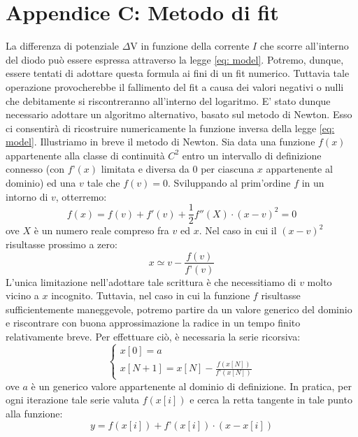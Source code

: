 \documentclass{article}[a4paper, oneside, 11pt]
\begin{document}
\section{Appendice C: Metodo di fit}\label{app: C}
La differenza di potenziale $\Delta$V in funzione della corrente $I$ che scorre 
all’interno del diodo può essere espressa attraverso la legge
\eqref{eq: model}. Potremo, dunque, essere tentati di adottare questa formula
ai fini di un fit numerico. 
Tuttavia tale operazione provocherebbe il fallimento del fit a causa dei valori 
negativi o nulli che debitamente si riscontreranno all’interno del logaritmo. 
E’ stato dunque necessario adottare un algoritmo alternativo, basato sul 
metodo di Newton\cite{tesi}. Esso ci consentirà di ricostruire numericamente 
la funzione inversa della legge \eqref{eq: model}.
Illustriamo in breve il metodo di Newton. Sia data una funzione $f(x)$
appartenente alla classe di continuità $C^{2}$
entro un intervallo di definizione connesso (con $f’(x)$ limitata e 
diversa da $0$ per ciascuna $x$ appartenente al dominio) ed una $v$ tale che
$f(v) = 0$. Sviluppando al prim’ordine $f$ in un intorno di $v$, otterremo:
\begin{equation}
f(x) = f(v) + f{'}(v) + {\frac{1}{2}} {f{''}(X)} \cdot  {( x - v)^2} = 0
\end{equation}
ove $X$ è un numero reale compreso fra $v$ ed $x$. Nel caso in cui il $(x-v)^2 
$risultasse prossimo a zero:
\begin{equation}
x \simeq v   -  {\frac {f(v)}{f’(v)}}
\end{equation}
L’unica limitazione nell'adottare tale scrittura è che necessitiamo di $v$ 
molto vicino a $x$ incognito. Tuttavia, nel caso in cui la funzione $f$ risultasse 
sufficientemente maneggevole, potremo partire da un valore generico del dominio 
e riscontrare con buona approssimazione la radice in un tempo finito 
relativamente breve. Per effettuare ciò, è necessaria la serie ricorsiva:
\begin{equation}
\begin{cases}
x[0] = a \\ x[N+1] = x[N] - \frac {f(x[N])} {f’(x[N])}
\end{cases}
\end{equation}
ove $a$ è un generico valore appartenente al dominio di definizione. In pratica, 
per ogni iterazione tale serie valuta $f(x[i])$ e cerca la retta tangente in tale 
punto alla funzione:
\begin{equation}
y = f(x[i]) + f’(x[i]) \cdot (x-x[i])
\end{equation}
\end{document}
